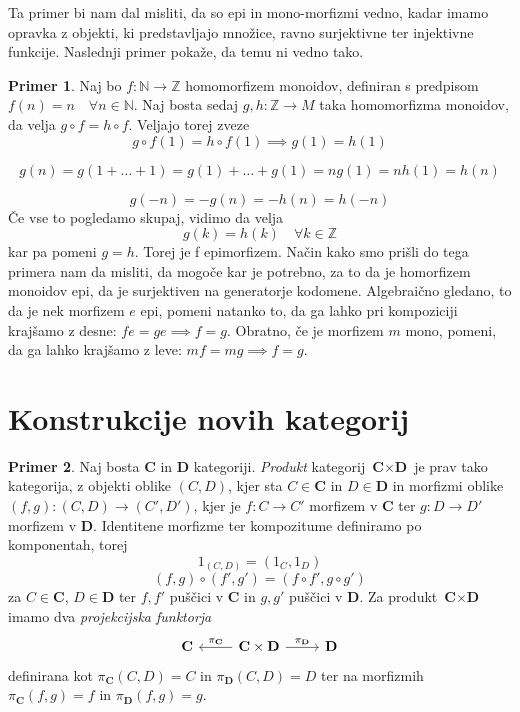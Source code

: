 \documentclass[12pt,a4paper]{book}
\theoremstyle{definition}
\theoremstyle{plain}
\theoremstyle{definition}
\newtheorem{primer}{Primer}[section]
\theoremstyle{remark}
\newcommand{\cat}[1]{\textbf{#1}}
\begin{document}
Ta primer bi nam dal misliti, da so epi in mono-morfizmi vedno, kadar imamo opravka z objekti, ki predstavljajo množice, ravno surjektivne ter injektivne funkcije. Naslednji primer pokaže, da temu ni vedno tako.

\begin{primer}
Naj bo $f : \mathbb{N} \to \mathbb{Z}$ homomorfizem monoidov, definiran s predpisom $f(n) = n \quad \forall n \in \mathbb{N}$. Naj bosta sedaj $g,h: \mathbb{Z} \to M$ taka homomorfizma monoidov, da velja $g \circ f = h \circ f$. Veljajo torej zveze
$$ g \circ f(1) = h \circ f(1) \implies g(1) = h(1)$$

$$
g(n) = g(1+\ldots + 1) = g(1) + \ldots + g(1) = ng(1) = n h(1) = h(n)
$$

$$ g(-n) = -g(n) = -h(n) = h(-n)$$
Če vse to pogledamo skupaj, vidimo da velja
$$g(k) = h(k) \quad \forall k \in \mathbb{Z}$$
kar pa pomeni $g = h$. Torej je f epimorfizem. Način kako smo prišli do tega primera nam da misliti, da mogoče kar je potrebno, za to da je homorfizem monoidov epi, da je surjektiven na generatorje kodomene.
Algebraično gledano, to da je nek morfizem $e$ epi, pomeni natanko to, da ga lahko pri kompoziciji krajšamo z desne: $fe = ge \implies f=g$. Obratno, če je morfizem $m$ mono, pomeni, da ga lahko krajšamo z leve: $mf = mg \implies f = g$.

\end{primer}


\section{Konstrukcije novih kategorij}

\begin{primer}
Naj bosta $\cat{C}$ in $\cat{D}$ kategoriji. \textit{Produkt} kategorij $\cat{C} \times \cat{D}$ je prav tako kategorija, z objekti oblike $(C,D)$, kjer sta $C \in \cat{C}$ in $D \in \cat{D}$ in morfizmi oblike $(f,g) : (C,D) \to (C',D')$, kjer je $f : C \to C'$ morfizem v $\cat{C}$ ter $g : D \to D'$ morfizem v $\cat{D}$. Identitene morfizme ter kompozitume definiramo po komponentah, torej
\begin{equation*}
1_{(C,D)} = (1_C,1_D)
\end{equation*}
\begin{equation*}
(f,g) \circ (f',g') = (f \circ f', g \circ g')
\end{equation*}
za $C \in \cat{C}$, $D \in \cat{D}$ ter $f,f'$ puščici v $\cat{C}$ in $g,g'$ puščici v $\cat{D}$.
Za produkt $\cat{C} \times \cat{D}$ imamo dva \textit{projekcijska funktorja} 
\[
\begin{tikzcd}
\cat{C} & \arrow[l, "\pi_{\cat{C}}"'] \cat{C} \times \cat{D} \arrow[r, "\pi_{\cat{D}}"] & \cat{D}
\end{tikzcd}
\]
definirana kot $\pi_{\cat{C}}(C,D) = C$ in $\pi_{\cat{D}}(C,D) = D$ ter na morfizmih $\pi_{\cat{C}}(f,g) = f$ in $\pi_{\cat{D}}(f,g) = g$.
\end{primer}
\end{document}
